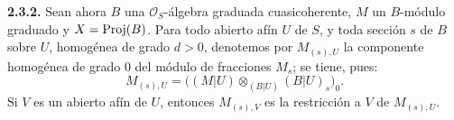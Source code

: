 \providecommand{\sisi}[2]{#2}

\textbf{2.3.2.} Sean ahora \(B\) una \(\mathcal O_S\)-álgebra graduada cuasicoherente, \(M\) un \(B\)-módulo graduado y \(X=\operatorname{Proj}(B)\). Para todo abierto afín \(U\) de \(S\), y toda sección \(s\) de \(B\) sobre \(U\), homogénea de grado \(d>0\), denotemos por \(M_{(s),U}\) la componente homogénea de grado \(0\) del módulo de fracciones \(M_s\); se tiene, pues:
\[
  M_{(s),U}=
  \bigl((M|U)\otimes_{(B|U)}(B|U)_s\bigr)_0 .
\]
Si \(V\) es un abierto afín de \(U\), entonces \(M_{(s),V}\) es la restricción a \(V\) de \(M_{(s),U}\).

